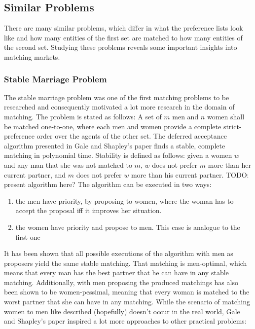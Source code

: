 \subsection{Similar Problems}
There are many similar problems, which differ in what the preference lists look like and how many entities of the first set are matched to how many entities of the second set. Studying these problems reveals some important insights into matching markets.

\subsubsection{Stable Marriage Problem}
The stable marriage problem was one of the first matching problems to be researched\cite{GaleShapleyOrig} and consequently motivated a lot more research in the domain of matching.
\newline
The problem is stated as follows: A set of $m$ men and $n$ women shall be matched one-to-one, where each men and women provide a complete strict-preference order over the agents of the other set. The deferred acceptance algorithm presented in Gale and Shapley's paper\cite{GaleShapleyOrig}
finds a stable, complete matching in polynomial time. Stability is defined as follows: given a women $w$ and any man that she was not matched to $m$, $w$ does not prefer $m$ more than her current partner, and $m$ does not prefer $w$ more than his current partner. 
\newline
TODO: present algorithm here?
\newline
The algorithm can be executed in two ways: 
\begin{enumerate}
    \item the men have priority, by proposing to women, where the woman has to accept the proposal iff it improves her situation.  
    \item the women have priority and propose to men. This case is analogue to the first one
\end{enumerate}
It has been shown that all possible executions of the algorithm with men as proposers yield the same stable matching. That matching is men-optimal, which means that every man has the best partner that he can have in any stable matching.\cite{Gusfield} Additionally, with men proposing the produced matchings has also been shown to be women-pessimal, meaning that every woman is matched to the worst partner that she can have in any matching.\cite{Gusfield}
\newline
While the scenario of matching women to men like described (hopefully) doesn't occur in the real world, Gale and Shapley's paper inspired a lot more approaches to other practical problems:

